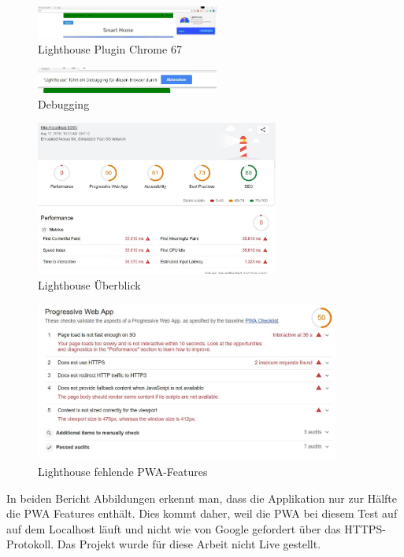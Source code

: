 \begin{figure}[h]
	\centering
	\includegraphics[width=6cm]{BilderAllgemein/Test/LighthousePlugIN}\medskip
	\caption{Lighthouse Plugin Chrome 67 }
	\label{fig:LighthousePlugIN}
\end{figure}
\begin{figure}[h]
	\centering
	\includegraphics[width=6cm]{BilderAllgemein/Test/debuggingLighthouse}\medskip
	\caption{Debugging}
	\label{fig:LighthouseDebugging}
\end{figure}
 

\begin{figure}[h]
	\centering
	\includegraphics[width=8cm]{BilderAllgemein/Test/LightH_beforHTTPS_Overview}\medskip
	\caption{Lighthouse Überblick}
	\label{fig:LightH_beforHTTPS_Overview}
\end{figure}

\begin{figure}[h]
	\centering
	\includegraphics[width=10cm]{BilderAllgemein/Test/PWA_Test_Lighthouse_noHTTPS}\medskip
	\caption{Lighthouse fehlende PWA-Features}
	\label{fig:PWA_Test_Lighthouse_noHTTPS}
\end{figure}

In beiden Bericht Abbildungen erkennt man, dass die Applikation nur zur Hälfte die PWA Features enthält.
Dies kommt daher, weil die \acs{PWA} bei diesem Test auf auf dem Localhost läuft und nicht wie von Google gefordert über das HTTPS-Protokoll.
Das Projekt wurde für diese Arbeit nicht Live gestellt.

